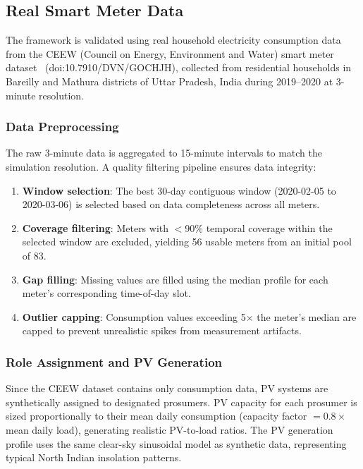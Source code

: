 \documentclass[pdflatex,sn-mathphys-num]{sn-jnl}
\theoremstyle{thmstyleone}
\theoremstyle{thmstyletwo}
\begin{document}
\subsection{Real Smart Meter Data}

The framework is validated using real household electricity consumption data from the CEEW (Council on Energy, Environment and Water) smart meter dataset~\cite{ceew2021} (doi:10.7910/DVN/GOCHJH), collected from residential households in Bareilly and Mathura districts of Uttar Pradesh, India during 2019--2020 at 3-minute resolution.

\subsubsection{Data Preprocessing}

The raw 3-minute data is aggregated to 15-minute intervals to match the simulation resolution. A quality filtering pipeline ensures data integrity:
\begin{enumerate}
    \item \textbf{Window selection}: The best 30-day contiguous window (2020-02-05 to 2020-03-06) is selected based on data completeness across all meters.
    \item \textbf{Coverage filtering}: Meters with $<$90\% temporal coverage within the selected window are excluded, yielding 56 usable meters from an initial pool of 83.
    \item \textbf{Gap filling}: Missing values are filled using the median profile for each meter's corresponding time-of-day slot.
    \item \textbf{Outlier capping}: Consumption values exceeding 5$\times$ the meter's median are capped to prevent unrealistic spikes from measurement artifacts.
\end{enumerate}

\subsubsection{Role Assignment and PV Generation}

Since the CEEW dataset contains only consumption data, PV systems are synthetically assigned to designated prosumers. PV capacity for each prosumer is sized proportionally to their mean daily consumption (capacity factor $= 0.8 \times$ mean daily load), generating realistic PV-to-load ratios. The PV generation profile uses the same clear-sky sinusoidal model as synthetic data, representing typical North Indian insolation patterns.
\end{document}
